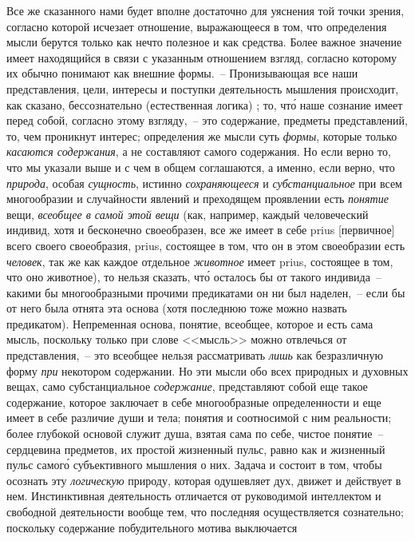 Все же сказанного нами будет вполне достаточно для
уяснения той точки зрения, согласно которой исчезает
отношение, выражающееся в том, что определения мысли
берутся только как нечто полезное и как средства. Более
важное значение имеет находящийся в связи с указанным
отношением взгляд, согласно которому их обычно понимают
как внешние формы.~-- Пронизывающая все наши
представления, цели, интересы и поступки деятельность
мышления происходит, как сказано, бессознательно (естественная
логика) ; то, чт\'о наше сознание имеет перед
собой, согласно этому взгляду,~-- это содержание, предметы
представлений, то, чем проникнут интерес; определения
же мысли суть \emph{формы}, которые только \emph{касаются
содержания}, а не составляют самого содержания. Но если
верно то, что мы указали выше и с чем в общем соглашаются,
а именно, если верно, что \emph{природа}, особая \emph{сущность},
истинно \emph{сохраняющееся} и \emph{субстанциальное} при
всем многообразии и случайности явлений и преходящем
проявлении есть \emph{понятие} вещи, \emph{всеобщее в самой этой
вещи} (как, например, каждый человеческий индивид,
хотя и бесконечно своеобразен, все же имеет в себе prius
[первичное] всего своего своеобразия, prius, состоящее в
том, что он в этом своеобразии есть \emph{человек}, так же как
каждое отдельное \emph{животное} имеет prius, состоящее в том,
что оно животное), то нельзя сказать, чт\'о осталось бы от
такого индивида~-- какими бы многообразными прочими
предикатами он ни был наделен,~-- если бы от него была
отнята эта основа (хотя последнюю тоже можно назвать
предикатом). Непременная основа, понятие, всеобщее, которое
и есть сама мысль, поскольку только при слове
<<мысль>> можно отвлечься от представления,~-- это всеобщее
нельзя рассматривать \emph{лишь} как безразличную форму
\emph{при} некотором содержании. Но эти мысли обо всех природных
и духовных вещах, само субстанциальное \emph{содержание},
представляют собой еще такое содержание, которое
заключает в себе многообразные определенности и
еще имеет в себе различие души и тела; понятия и соотносимой
с ним реальности; более глубокой основой служит
душа, взятая сама по себе, чистое понятие~-- сердцевина
предметов, их простой жизненный пульс, равно как
и жизненный пульс самог\'о субъективного мышления о
них. Задача и состоит в том, чтобы осознать эту \emph{логическую}
природу, которая одушевляет дух, движет и действует
в нем. Инстинктивная деятельность отличается от
руководимой интеллектом и свободной деятельности
вообще тем, что последняя осуществляется сознательно;
поскольку содержание побудительного мотива выключается
